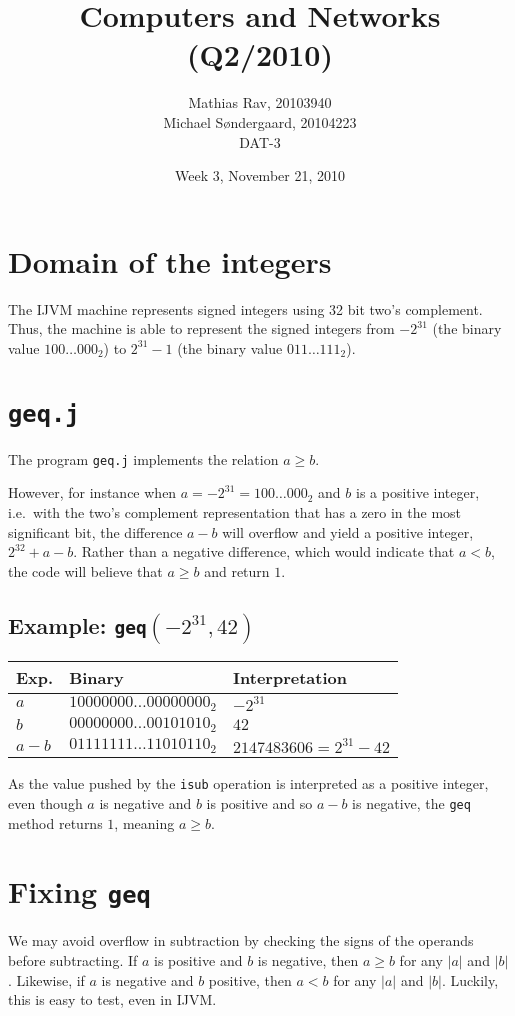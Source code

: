 \documentclass[12pt,a4paper]{article}
\title{Computers and Networks (Q2/2010)}
\author{Mathias Rav, 20103940 \\
		Michael Søndergaard, 20104223 \\
		DAT-3}
\date{Week 3, November 21, 2010}
\begin{document}
\maketitle
\section{Domain of the integers}
The IJVM machine represents signed integers using 32 bit two's complement.
Thus, the machine is able to represent the signed integers from $-2^{31}$ (the
binary value $100\dots000_2$) to $2^{31}-1$ (the binary value $011\dots111_2$).
\section{\texttt{geq.j}}
The program \texttt{geq.j} implements the relation $a\geq b$. 

However, for instance when $a=-2^{31}=100\dots000_2$ and $b$ is a positive
integer, i.e.\ with the two's complement representation that has a zero in the
most significant bit, the difference $a-b$ will overflow and yield a positive
integer, $2^{32}+a-b$. Rather than a negative difference, which would indicate
that $a<b$, the code will believe that $a\geq b$ and return $1$.
\subsection{Example: \texttt{geq}$(-2^{31}, 42)$}
\begin{tabular}{lll}
	Exp. & Binary & Interpretation \\
	\hline
	$a$ &   $10000000 \dots 00000000_2$ & $-2^{31}$ \\
	$b$ &   $00000000 \dots 00101010_2$ & $42$ \\
	$a-b$ & $01111111 \dots 11010110_2$ & $2147483606=2^{31}-42$
\end{tabular}

As the value pushed by the \texttt{isub} operation is interpreted as a positive
integer, even though $a$ is negative and $b$ is positive and so $a-b$ is
negative, the \texttt{geq} method returns $1$, meaning $a\geq b$.
\section{Fixing \texttt{geq}}
We may avoid overflow in subtraction by checking the signs of the operands
before subtracting. If $a$ is positive and $b$ is negative, then $a\geq b$ for
any $|a|$ and $|b|$. Likewise, if $a$ is negative and $b$ positive, then $a<b$
for any $|a|$ and $|b|$. Luckily, this is easy to test, even in IJVM.
\end{document}
